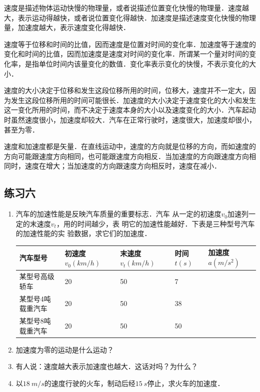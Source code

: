 速度是描述物体运动快慢的物理量，或者说描述位置变化快慢的物理量．速度越大，表示运动得越快，或者说位置变化得越快．加速度是描述速度变化快慢的物理量，加速度越大，表示速度变化得越快．

速度等于位移和时间的比值，因而速度是位置对时间的变化率．加速度等于速度的变化和时间的比值，因而加速度是速度对时间的变化率．所谓某一个量对时间的变化率，是指单位时间内该量变化的数值．变化率表示变化的快慢，不表示变化的大小．

速度的大小决定于位移和发生这段位移所用的时间，位移大，速度并不一定大，因为发生这段位移所用的时间可能很长．加速度的大小决定于速度变化的大小和发生这一变化所用的时间，而不决定于速度本身的大小以及速度变化的大小．汽车起动时虽然速度很小，加速度却较大．汽车在正常行驶时，速度很大，加速度却很小，甚至为零．

速度和加速度都是矢量．在直线运动中，速度的方向就是位移的方向，而如速度的方向可能跟速度方向相同，也可能跟速度方向相反．当加速度的方向跟速度方向相同时，速度在增大；当加速度的方向跟速度方向相反时，速度在减小．

\subsection*{练习六}
\begin{enumerate}
    \item  汽车的加速性能是反映汽车质量的重要标志．汽车
          从一定的初速度$v_0$加速列一定的末速度$v_t$，用的时间越少，表
          明它的加速性能越好．下表是三种型号汽车的加速性能的实
          验数据，求它们的加速度．
          \begin{table}[H]
              \centering
              \begin{tabularx}{0.95\textwidth}{p{3.3cm}MMMM}
                  \toprule[1.5pt]
                  汽车型号      & 初速度$v_0(\si{km/h})$ & 末速度$v_t(\si{km/h})$ & 时间$t(\si{s})$ & 加速度$a(\si{m/s^2})$ \\
                  \midrule
                  某型号高级轿车   & 20                  & 50                  & 7                                  \\
                  某型号4吨载重汽车 & 20                  & 50                  & 38                                 \\
                  某型号8吨载重汽车 & 20                  & 50                  & 50                                 \\
                  \bottomrule[1.5pt]
              \end{tabularx}
          \end{table}
    \item  加速度为零的运动是什么运动？
    \item  有人说：速度越大表示加速度也越大．这话对吗？为什么？
    \item 以$\qty{18}{m/s}$的速度行驶的火车，制动后经$\qty{15}{s}$停止，求火车的加速度．
\end{enumerate}

